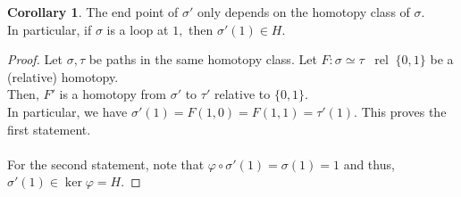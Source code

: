 \documentclass[12pt]{article}
\theoremstyle{definition}
\numberwithin{thm}{section}
\newtheorem{cor}[thm]{Corollary}
\newcommand{\rel}{\;\;\operatorname{rel}\;}
\begin{document}
\begin{cor} \label{cor:endpthomot}
	The end point of $\sigma'$ only depends on the homotopy class of $\sigma.$\\
	In particular, if $\sigma$ is a loop at $1,$ then $\sigma'(1) \in H.$
\end{cor}
\begin{proof} 
	Let $\sigma, \tau$ be paths in the same homotopy class. Let $F:\sigma \simeq \tau \rel \{0, 1\}$ be a (relative) homotopy.\\
	Then, $F'$ is a homotopy from $\sigma'$ to $\tau'$ relative to $\{0, 1\}.$\\
	In particular, we have $\sigma'(1) = F(1, 0) = F(1, 1) = \tau'(1).$ This proves the first statement.\\~\\
	For the second statement, note that $\varphi\circ\sigma'(1) = \sigma(1) = 1$ and thus, $\sigma'(1) \in \ker\varphi = H.$
\end{proof}
\end{document}

